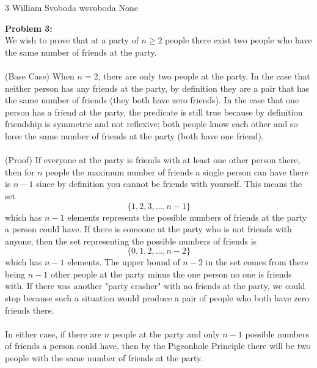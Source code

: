 \documentclass[12pt,letterpaper]{cos340hw}
\begin{document}
           {3}            %
           {William Svoboda}  %
           {wsvoboda}   %
           {None} 




\noindent\textbf{Problem 3:}\\
We wish to prove that at a party of $n\ge2$ people there exist two people who have the same number
of friends at the party.\\\\
(Base Case) When $n=2$, there are only two people at the party. In the case that neither person has
any friends at the party, by definition they are a pair that has the same number of friends (they 
both have zero friends). In the case that one person has a friend at the party, the predicate is still true
because by definition friendship is symmetric and not reflexive; both people know each other and so
have the same number of friends at the party (both have one friend).\\\\
(Proof) If everyone at the party is friends with at least one other person there, then for $n$ people the
maximum number of friends a single person can have there is $n-1$ since by definition you cannot be 
friends with yourself. This means the set
$$\{1,2,3,\dots, n-1\}$$
which has $n-1$ elements represents the possible numbers of friends at the party a person could have. 
If there is someone at the party who is not friends with anyone, then the set representing the possible
numbers of friends is
$$\{0,1,2,\dots, n-2\}$$
which has $n-1$ elements. The upper bound of $n-2$ in the set comes from there being $n-1$ other
people at the party minus the one person no one is friends with. If there was another "party crasher" 
with no friends at the party, we could stop because such a situation would produce a pair of people who 
both have zero friends there.\\\\
In either case, if there are $n$ people at the party and only $n-1$ possible numbers of friends a person 
could have, then by the Pigeonhole Principle there will be two people with the same number of friends 
at the party.

\end{document}
